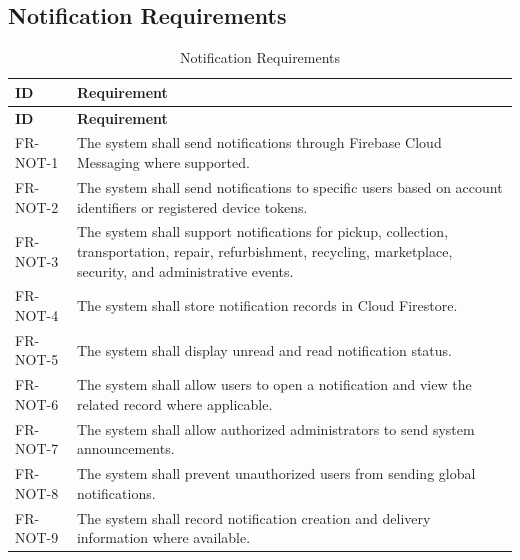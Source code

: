 \subsection{Notification Requirements}
\begin{longtable}{@{}p{2.4cm}p{11cm}@{}}
\caption{Notification Requirements} \label{tab:fr-not} \\
\toprule \textbf{ID} & \textbf{Requirement} \\ \midrule
\endfirsthead
\toprule \textbf{ID} & \textbf{Requirement} \\ \midrule
\endhead
FR-NOT-1 & The system shall send notifications through Firebase Cloud Messaging where supported. \\
FR-NOT-2 & The system shall send notifications to specific users based on account identifiers or registered device tokens. \\
FR-NOT-3 & The system shall support notifications for pickup, collection, transportation, repair, refurbishment, recycling, marketplace, security, and administrative events. \\
FR-NOT-4 & The system shall store notification records in Cloud Firestore. \\
FR-NOT-5 & The system shall display unread and read notification status. \\
FR-NOT-6 & The system shall allow users to open a notification and view the related record where applicable. \\
FR-NOT-7 & The system shall allow authorized administrators to send system announcements. \\
FR-NOT-8 & The system shall prevent unauthorized users from sending global notifications. \\
FR-NOT-9 & The system shall record notification creation and delivery information where available. \\
\bottomrule
\end{longtable}

